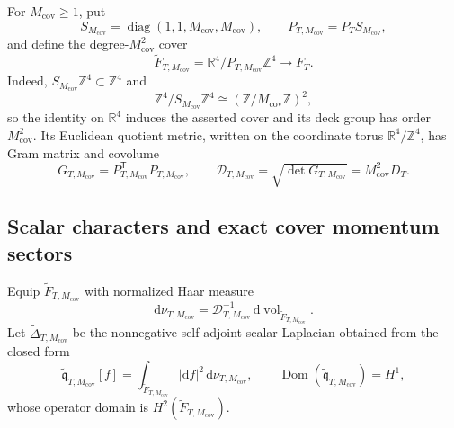\documentclass[11pt]{article}
\theoremstyle{definition}
\numberwithin{equation}{section}
\begin{document}
For \(M_{\mathrm{cov}}\geq1\), put
\begin{equation}
 S_{M_{\mathrm{cov}}}
 =\operatorname{diag}(1,1,M_{\mathrm{cov}},M_{\mathrm{cov}}),
 \qquad
 P_{T,M_{\mathrm{cov}}}=P_TS_{M_{\mathrm{cov}}},
 \label{cusp-link-cover-matrix}
\end{equation}
and define the degree-\(M_{\mathrm{cov}}^2\) cover
\begin{equation}
 \widetilde F_{T,M_{\mathrm{cov}}}
 =\mathbb R^4/P_{T,M_{\mathrm{cov}}}\mathbb Z^4
 \longrightarrow F_T.
 \label{cusp-link-cover-torus}
\end{equation}
Indeed,
\(S_{M_{\mathrm{cov}}}\mathbb Z^4\subset\mathbb Z^4\) and
\[
 \mathbb Z^4/S_{M_{\mathrm{cov}}}\mathbb Z^4
 \cong(\mathbb Z/M_{\mathrm{cov}}\mathbb Z)^2,
\]
so the identity on \(\mathbb R^4\) induces the asserted cover and its deck
group has order \(M_{\mathrm{cov}}^2\).
Its Euclidean quotient metric, written on the coordinate torus
\(\mathbb R^4/\mathbb Z^4\), has Gram matrix and covolume
\begin{equation}
 G_{T,M_{\mathrm{cov}}}
 =P_{T,M_{\mathrm{cov}}}^{\mathsf T}P_{T,M_{\mathrm{cov}}},
 \qquad
 \mathcal D_{T,M_{\mathrm{cov}}}
 =\sqrt{\det G_{T,M_{\mathrm{cov}}}}
 =M_{\mathrm{cov}}^2D_T.
 \label{cusp-link-cover-metric}
\end{equation}

\subsection{Scalar characters and exact cover momentum sectors}

Equip \(\widetilde F_{T,M_{\mathrm{cov}}}\) with normalized Haar measure
\begin{equation}
 \mathrm d\nu_{T,M_{\mathrm{cov}}}
 =\mathcal D_{T,M_{\mathrm{cov}}}^{-1}\,
   \mathrm d\operatorname{vol}_{\widetilde F_{T,M_{\mathrm{cov}}}}.
 \label{cusp-link-normalized-cover-measure}
\end{equation}
Let \(\widetilde\Delta_{T,M_{\mathrm{cov}}}\) be the nonnegative
self-adjoint scalar Laplacian obtained from the closed form
\begin{equation}
 \widetilde{\mathfrak q}_{T,M_{\mathrm{cov}}}[f]
 =\int_{\widetilde F_{T,M_{\mathrm{cov}}}}|\mathrm df|^2\,
       \mathrm d\nu_{T,M_{\mathrm{cov}}},
 \qquad
 \operatorname{Dom}(\widetilde{\mathfrak q}_{T,M_{\mathrm{cov}}})=H^1,
 \label{cusp-link-cover-dirichlet-form}
\end{equation}
whose operator domain is \(H^2(\widetilde F_{T,M_{\mathrm{cov}}})\).
\end{document}
